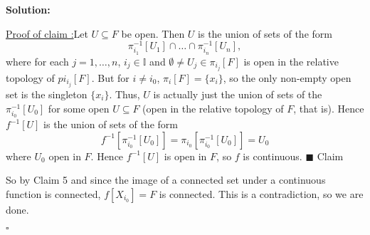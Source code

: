 \documentclass[12pt]{article}
\newcounter{ProofCounter}
\newcounter{ClaimCounter}[ProofCounter]
\newenvironment{Solution}{\stepcounter{ProofCounter}\textbf{Solution:}}{\hfill$\square$}
\newenvironment{claim}[1]{\vspace{1mm}\stepcounter{ClaimCounter}\par\noindent\underline{\bf Claim \theClaimCounter:}\space#1}{}
\newenvironment{claimproof}[1]{\par\noindent\underline{Proof of claim \theClaimCounter:}\space#1}{\hfill $\blacksquare$ Claim \theClaimCounter}
\begin{document}
\begin{Solution}
\begin{enumerate}
      \begin{claimproof}
        Let $U \subseteq F$ be open. Then $U$ is the union of sets of the form 
        \[
          \pi_{i_1}^{-1}[U_1] \cap \dots \cap \pi_{i_n}^{-1}[U_n],
        \]
        where for each $j = 1, \dots, n$, $i_j \in \mathbb{I}$ and $\emptyset \neq U_j \in \pi_{i_j}[F]$ is open  
        in the relative topology of $pi_{i_j}[F]$.
        But for $i \neq i_0$, $\pi_{i}[F] = \{x_i\}$, so the only non-empty open set
        is the singleton $\{x_i\}$. Thus, $U$ is actually just the union of sets of the $\pi_{i_0}^{-1}[U_0]$ for some open $U \subseteq F$ (open in the relative
        topology of $F$, that is). Hence $f^{-1}[U]$ is the union of sets of the form 
        \[
          f^{-1}[\pi_{i_0}^{-1}[U_0]] = \pi_{i_0}[\pi_{i_0}^{-1}[U_0]] = U_0
        \]
        where $U_0$ open in $F$. Hence $f^{-1}[U]$ is open in $F$, so $f$ is continuous.
      \end{claimproof}

      So by Claim 5 and since the image of a connected set under a continuous function is connected, $f[X_{i_0}] = F$ is connected. This is a
      contradiction, so we are done.
  \end{enumerate}
\end{Solution}
\end{document}
